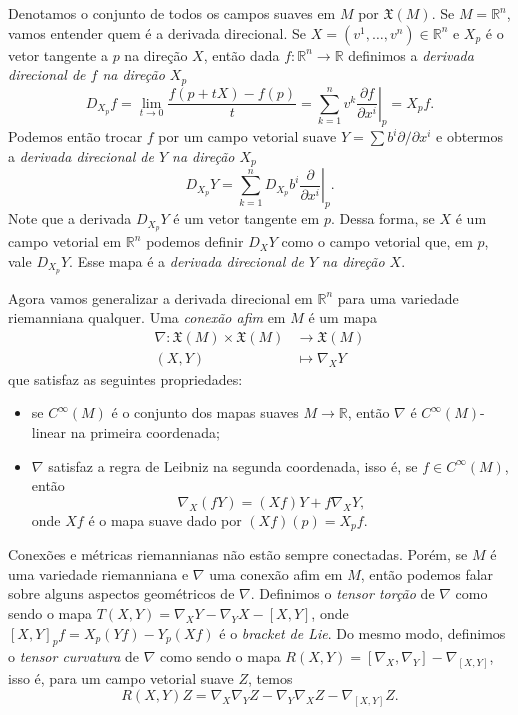 \documentclass{article}
\begin{document}
Denotamos o conjunto de todos os campos suaves em $M$ por $\mathfrak{X}(M)$. Se $M = \mathbb{R}^n$, vamos entender quem é a derivada direcional. Se $X = (v^1, \dots, v^n) \in \mathbb{R}^n$ e $X_p$ é o vetor tangente a $p$ na direção $X$, então dada $f \colon \mathbb{R}^n \to \mathbb{R}$ definimos a \textit{derivada direcional de $f$ na direção $X_p$} \begin{equation}
    D_{X_p}f = \lim_{t \to 0} \frac{f(p + tX) - f(p)}{t} = \sum_{k = 1}^n v^k \left.\frac{\partial f}{\partial x^i}\right|_p =  X_pf.
\end{equation}
Podemos então trocar $f$ por um campo vetorial suave $Y = \sum b^i \partial/\partial x^i$ e obtermos a \textit{derivada direcional de $Y$ na direção $X_p$} \begin{equation}
    D_{X_p}Y = \sum_{k = 1}^n D_{X_p}b^i \left.\frac{\partial}{\partial x^i}\right|_p.
\end{equation}
Note que a derivada $D_{X_p}Y$ é um vetor tangente em $p$. Dessa forma, se $X$ é um campo vetorial em $\mathbb{R}^n$ podemos definir $D_XY$ como o campo vetorial que, em $p$, vale $D_{X_p}Y$. Esse mapa é a \textit{derivada direcional de $Y$ na direção $X$}.

Agora vamos generalizar a derivada direcional em $\mathbb{R}^n$ para uma variedade riemanniana qualquer. Uma \textit{conexão afim} em $M$ é um mapa \begin{align*}
    \nabla \colon \mathfrak{X}(M) \times \mathfrak{X}(M) &\to \mathfrak{X}(M) \\ (X, Y) &\mapsto \nabla_XY
\end{align*}
que satisfaz as seguintes propriedades:
\begin{itemize}
    \item se $C^\infty(M)$ é o conjunto dos mapas suaves $M \to \mathbb{R}$, então $\nabla$ é $C^{\infty}(M)$-linear na primeira coordenada;
    \item $\nabla$ satisfaz a regra de Leibniz na segunda coordenada, isso é, se $f \in C^{\infty}(M)$, então \begin{equation}
        \nabla_X(fY) = (Xf)Y + f\nabla_XY,
    \end{equation} onde $Xf$ é o mapa suave dado por $(Xf)(p) = X_pf$.
\end{itemize}

Conexões e métricas riemannianas não estão sempre conectadas. Porém, se $M$ é uma variedade riemanniana e $\nabla$ uma conexão afim em $M$, então podemos falar sobre alguns aspectos geométricos de $\nabla$. Definimos o \textit{tensor torção} de $\nabla$ como sendo o mapa $T(X, Y) = \nabla_XY - \nabla_YX - [X,Y]$, onde $[X,Y]_pf = X_p(Yf) - Y_p(Xf)$ é o \textit{bracket de Lie}. Do mesmo modo, definimos o \textit{tensor curvatura} de $\nabla$ como sendo o mapa $R(X,Y) = [\nabla_X, \nabla_Y] - \nabla_{[X,Y]}$, isso é, para um campo vetorial suave $Z$, temos \begin{equation}
    R(X,Y)Z = \nabla_X\nabla_YZ - \nabla_Y\nabla_XZ - \nabla_{[X, Y]}Z.
\end{equation}
\end{document}

